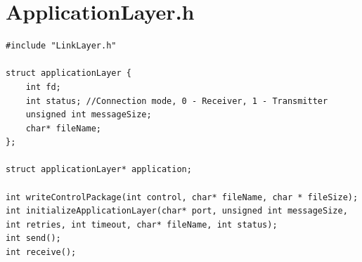 \documentclass[a4paper]{article}
\begin{document}
\section{ApplicationLayer.h}
\begin{lstlisting}
#include "LinkLayer.h"

struct applicationLayer {
    int fd;
    int status; //Connection mode, 0 - Receiver, 1 - Transmitter
    unsigned int messageSize;
    char* fileName;
};

struct applicationLayer* application;

int writeControlPackage(int control, char* fileName, char * fileSize);
int initializeApplicationLayer(char* port, unsigned int messageSize, int retries, int timeout, char* fileName, int status);
int send();
int receive();
\end{lstlisting}
\newpage
\end{document}
